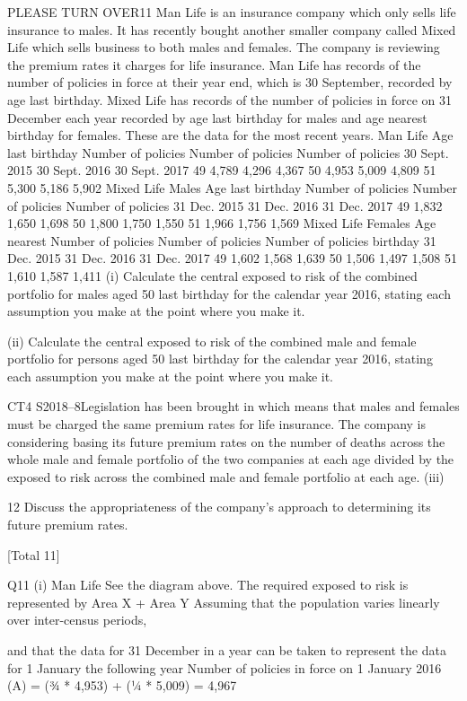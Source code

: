 \documentclass[a4paper,12pt]{article}
\begin{document}
PLEASE TURN OVER11
Man Life is an insurance company which only sells life insurance to males. It has
recently bought another smaller company called Mixed Life which sells business to
both males and females. The company is reviewing the premium rates it charges for
life insurance.
Man Life has records of the number of policies in force at their year end, which is
30 September, recorded by age last birthday. Mixed Life has records of the number
of policies in force on 31 December each year recorded by age last birthday for males
and age nearest birthday for females.
These are the data for the most recent years.
Man Life
Age last
birthday
Number of policies Number of policies Number of policies
30 Sept. 2015
30 Sept. 2016
30 Sept. 2017
49 4,789 4,296 4,367
50 4,953 5,009 4,809
51 5,300 5,186 5,902
Mixed Life Males
Age last
birthday
Number of policies Number of policies Number of policies
31 Dec. 2015
31 Dec. 2016
31 Dec. 2017
49 1,832 1,650 1,698
50 1,800 1,750 1,550
51 1,966 1,756 1,569
Mixed Life Females
Age nearest Number of policies Number of policies Number of policies
birthday
31 Dec. 2015
31 Dec. 2016
31 Dec. 2017
49 1,602 1,568 1,639
50 1,506 1,497 1,508
51 1,610 1,587 1,411
(i) Calculate the central exposed to risk of the combined portfolio for males aged
50 last birthday for the calendar year 2016, stating each assumption you make
at the point where you make it.

(ii) Calculate the central exposed to risk of the combined male and female
portfolio for persons aged 50 last birthday for the calendar year 2016, stating
each assumption you make at the point where you make it.

CT4 S2018–8Legislation has been brought in which means that males and females must be charged
the same premium rates for life insurance. The company is considering basing its
future premium rates on the number of deaths across the whole male and female
portfolio of the two companies at each age divided by the exposed to risk across the
combined male and female portfolio at each age.
(iii)

12
Discuss the appropriateness of the company’s approach to determining its
future premium rates.	

[Total 11]

Q11
(i)
Man Life
See the diagram above. The required exposed to risk is represented
by Area X + Area Y
Assuming that the population varies linearly over inter-census periods,

and that the data for 31 December in a year can be taken to represent
the data for 1 January the following year
Number of policies in force on 1 January 2016 (A)
= (3⁄4 * 4,953) + (1⁄4 * 5,009) = 4,967
\end{document}

